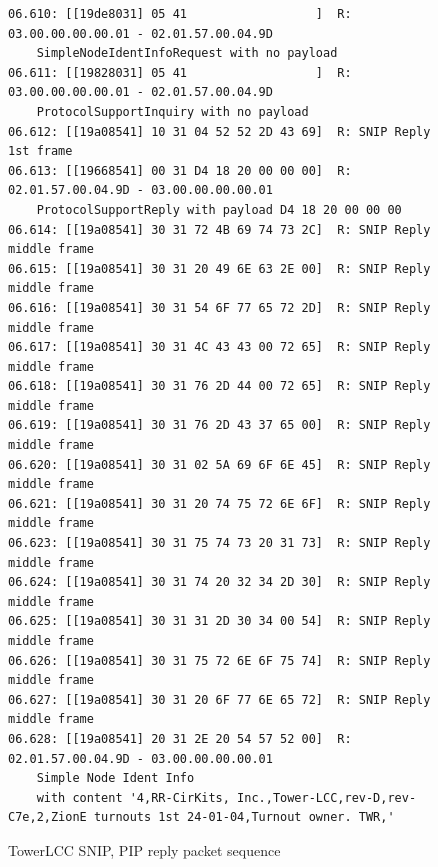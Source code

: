 \documentclass[11pt]{article}
\begin{document}
\begin{figure}[!htbp]
\begin{verbatim}
06.610: [[19de8031] 05 41                  ]  R: 03.00.00.00.00.01 - 02.01.57.00.04.9D 
    SimpleNodeIdentInfoRequest with no payload
06.611: [[19828031] 05 41                  ]  R: 03.00.00.00.00.01 - 02.01.57.00.04.9D 
    ProtocolSupportInquiry with no payload
06.612: [[19a08541] 10 31 04 52 52 2D 43 69]  R: SNIP Reply 1st frame
06.613: [[19668541] 00 31 D4 18 20 00 00 00]  R: 02.01.57.00.04.9D - 03.00.00.00.00.01 
    ProtocolSupportReply with payload D4 18 20 00 00 00
06.614: [[19a08541] 30 31 72 4B 69 74 73 2C]  R: SNIP Reply middle frame
06.615: [[19a08541] 30 31 20 49 6E 63 2E 00]  R: SNIP Reply middle frame
06.616: [[19a08541] 30 31 54 6F 77 65 72 2D]  R: SNIP Reply middle frame
06.617: [[19a08541] 30 31 4C 43 43 00 72 65]  R: SNIP Reply middle frame
06.618: [[19a08541] 30 31 76 2D 44 00 72 65]  R: SNIP Reply middle frame
06.619: [[19a08541] 30 31 76 2D 43 37 65 00]  R: SNIP Reply middle frame
06.620: [[19a08541] 30 31 02 5A 69 6F 6E 45]  R: SNIP Reply middle frame
06.621: [[19a08541] 30 31 20 74 75 72 6E 6F]  R: SNIP Reply middle frame
06.623: [[19a08541] 30 31 75 74 73 20 31 73]  R: SNIP Reply middle frame
06.624: [[19a08541] 30 31 74 20 32 34 2D 30]  R: SNIP Reply middle frame
06.625: [[19a08541] 30 31 31 2D 30 34 00 54]  R: SNIP Reply middle frame
06.626: [[19a08541] 30 31 75 72 6E 6F 75 74]  R: SNIP Reply middle frame
06.627: [[19a08541] 30 31 20 6F 77 6E 65 72]  R: SNIP Reply middle frame
06.628: [[19a08541] 20 31 2E 20 54 57 52 00]  R: 02.01.57.00.04.9D - 03.00.00.00.00.01 
    Simple Node Ident Info 
    with content '4,RR-CirKits, Inc.,Tower-LCC,rev-D,rev-C7e,2,ZionE turnouts 1st 24-01-04,Turnout owner. TWR,'
\end{verbatim}
\caption{TowerLCC SNIP, PIP reply packet sequence}
\label{fig:TWR_SNIP_PIP_reply_sequence}
\end{figure}
\end{document}
